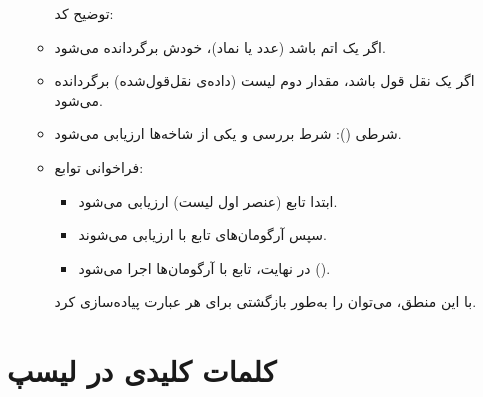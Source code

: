\documentclass[11pt, a4paper, oneside]{article}
\newcounter{itemadded}
\let\LaTeXStandardEnumerateBegin\enumerate
\let\LaTeXStandardEnumerateEnd\endenumerate
\renewenvironment{enumerate}{%
	\LaTeXStandardEnumerateBegin%
	\setcounter{itemadded}{0}
}{%
	\LaTeXStandardEnumerateEnd%
}%
\begin{document}
\begin{itemize}
\begin{itemize}
						توضیح کد:
						
						\begin{enumerate}
							
							\item اگر  یک اتم باشد (عدد یا نماد)، خودش برگردانده می‌شود.
							
							\item اگر  یک نقل قول باشد، مقدار دوم لیست (داده‌ی نقل‌قول‌شده) برگردانده می‌شود.
							
							\item شرطی (): شرط بررسی و یکی از شاخه‌ها ارزیابی می‌شود.
							
							\item فراخوانی توابع:
							
							\begin{itemize}
								
								\item ابتدا تابع (عنصر اول لیست) ارزیابی می‌شود.
								
								\item سپس آرگومان‌های تابع با  ارزیابی می‌شوند.
								
								\item در نهایت، تابع با آرگومان‌ها اجرا می‌شود ().
								
							\end{itemize}
							با این منطق، می‌توان  را به‌طور بازگشتی برای هر عبارت  پیاده‌سازی کرد.
							
							
						\end{enumerate}
						
				\end{itemize}
			
		\end{itemize}
		
		\section{کلمات کلیدی  در لیسپ}
			
\end{document}
